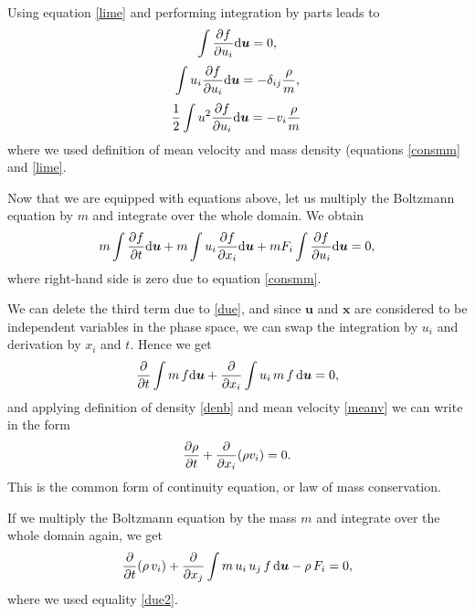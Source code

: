 Using equation \ref{lime} and performing integration by parts leads to
\begin{align} \label{due}
\int \frac{\partial f}{\partial u_i} \mathrm{d} \bm{u} = 0,
\end{align}
\begin{align} \label{due2}
\int u_i \frac{\partial f}{\partial u_i} \mathrm{d} \bm{u} = -\delta_{ij} \frac{\rho}{m},
\end{align}
\begin{align}
\frac{1}{2} \int u^2 \frac{\partial f}{\partial u_i} \mathrm{d} \bm{u} = - v_i \frac{\rho}{m} \, 
\end{align} 
where we used definition of mean velocity and mass density (equations \ref{consmm} and \ref{lime}.

Now that we are equipped with equations above, let us multiply the Boltzmann equation by $m$ and integrate over the whole domain. We obtain
\begin{align}
m \int \frac{\partial f}{\partial t} \mathrm{d} \bm{u} + m \int u_i \frac{\partial f}{\partial x_i} \mathrm{d} \bm{u} + m F_i \int \frac{\partial f}{\partial u_i} \mathrm{d} \bm{u} = 0,
\end{align}
where right-hand side is zero due to equation \ref{consmm}.

We can delete the third term due to \ref{due}, and since $\bm{u}$ and $\bm{x}$ are considered to be independent variables in the phase space, we can swap the integration by $u_i$ and derivation by $x_i$ and $t$. Hence we get
\begin{align}
\frac{\partial }{\partial t} \int m \, f \mathrm{d} \bm{u} + \frac{\partial}{\partial x_i} \int u_i \, m \, f \, \mathrm{d} \bm{u} = 0,
\end{align}
and applying definition of density \ref{denb} and mean velocity \ref{meanv}
we can write in the form
\begin{align}
\frac{\partial \rho}{\partial t} + \frac{\partial}{\partial x_i}(\rho v_i) = 0.
\end{align}
This is the common form of continuity equation, or law of mass conservation.

If we multiply the Boltzmann equation by the mass $m$ and integrate over the whole domain again, we get
\begin{align} \label{primeul}
\frac{\partial}{\partial t} (\rho \, v_i) + \frac{\partial }{\partial x_j} \int m \, u_i \, u_j \, f \, \mathrm{d} \bm{u} - \rho \, F_i = 0,
\end{align}
where we used equality \ref{due2}.

